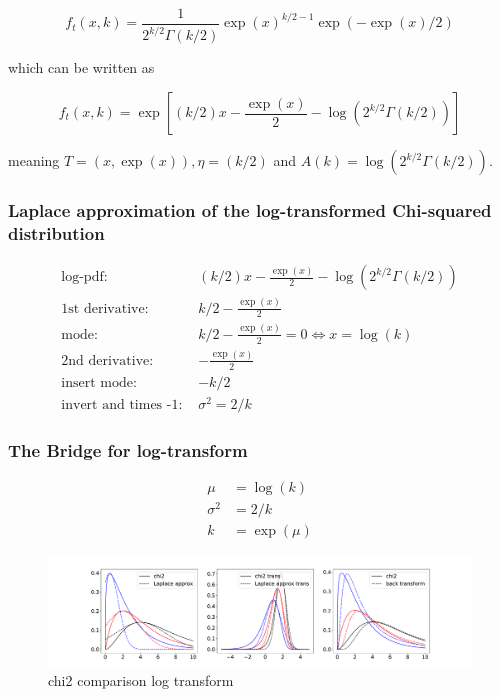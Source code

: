 \begin{equation}
	f_t(x,k) = \frac{1}{2^{k/2}\Gamma(k/2)}  \exp(x)^{k/2 -1} \exp(-\exp(x)/2)
	\label{eq:chi2_trans_pdf}
\end{equation}

which can be written as

\begin{equation}
	f_t(x, k) = \exp \left[(k/2)x - \frac{\exp(x)}{2} - \log(2^{k/2}\Gamma(k/2)) \right]
	\label{eq:chi2_trans_exp_family}
\end{equation}

meaning $T=(x, \exp(x)), \eta=(k/2)$ and $A(k) =  \log(2^{k/2}\Gamma(k/2))$. 

\subsubsection{Laplace approximation of the log-transformed Chi-squared distribution}

\begin{align*}
\text{log-pdf: } &(k/2)x - \frac{\exp(x)}{2} - \log(2^{k/2}\Gamma(k/2)) \\
\text{1st derivative: }&  k/2 - \frac{\exp(x)}{2} \\
\text{mode: }& k/2 - \frac{\exp(x)}{2} = 0 \Leftrightarrow x = \log(k)\\
\text{2nd derivative: }&  -\frac{\exp(x)}{2}\\
\text{insert mode: }& -k/2\\
\text{invert and times -1: }&\sigma^2 = 2/k
\end{align*}

\subsubsection{The Bridge for log-transform}

\begin{align}
	\mu &= \log(k) \\
	\sigma^2 &= 2/k \\
	k &= \exp(\mu)
\end{align}

\begin{figure}[!htb]
	\centering
	\includegraphics[width=\textwidth]{figures/chi2_playground_log.pdf}
	\caption{chi2 comparison log transform}
	\label{fig:chi2_log_comparison}
\end{figure}

